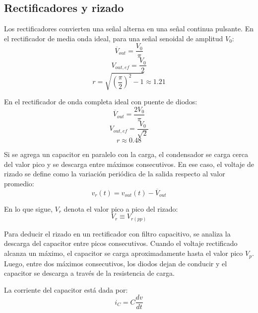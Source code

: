 \documentclass[12pt,a4paper]{article}
\begin{document}
\subsection{Rectificadores y rizado}

Los rectificadores convierten una señal alterna en una señal continua pulsante. En el rectificador de media onda ideal, para una señal senoidal de amplitud $V_0$:
\begin{equation}
\overline{V}_{out}=\frac{V_0}{\pi}
\end{equation}
\begin{equation}
V_{out,ef}=\frac{V_0}{2}
\end{equation}
\begin{equation}
r=\sqrt{\left(\frac{\pi}{2}\right)^2-1}\approx1.21
\end{equation}

En el rectificador de onda completa ideal con puente de diodos:
\begin{equation}
\overline{V}_{out}=\frac{2V_0}{\pi}
\end{equation}
\begin{equation}
V_{out,ef}=\frac{V_0}{\sqrt{2}}
\end{equation}
\begin{equation}
r\approx0.48
\end{equation}

Si se agrega un capacitor en paralelo con la carga, el condensador se carga cerca del valor pico y se descarga entre máximos consecutivos. En ese caso, el voltaje de rizado se define como la variación periódica de la salida respecto al valor promedio:
\begin{equation}
v_r(t)=v_{out}(t)-\overline{V}_{out}
\end{equation}

En lo que sigue, $V_r$ denota el valor pico a pico del rizado:
\begin{equation}
V_r\equiv V_{r(pp)}
\end{equation}

Para deducir el rizado en un rectificador con filtro capacitivo, se analiza la descarga del capacitor entre picos consecutivos. Cuando el voltaje rectificado alcanza un máximo, el capacitor se carga aproximadamente hasta el valor pico $V_p$. Luego, entre dos máximos consecutivos, los diodos dejan de conducir y el capacitor se descarga a través de la resistencia de carga.

La corriente del capacitor está dada por:
\begin{equation}
i_C=C\frac{dv}{dt}
\end{equation}
\end{document}
